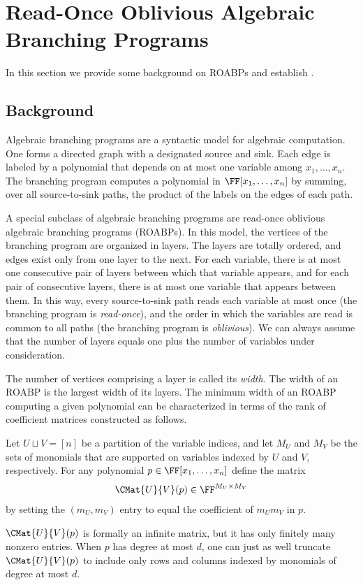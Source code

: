 \section{Read-Once Oblivious Algebraic Branching Programs}
\label{s.constant-width-roabp}

In this section we provide some background on ROABPs and establish
.

\subsection{Background}
\label{s.roabp.background}

Algebraic branching programs are a syntactic model for algebraic
computation.
One forms a directed graph with a designated source and sink.
Each edge is labeled by a polynomial that depends on at most one variable
among \(x_1,\ldots,x_n\).
The branching program computes a polynomial in \(\FF[x_1,\ldots,x_n]\) by
summing,
over all source-to-sink paths,
the product of the labels on the edges of each path.

A special subclass of algebraic branching programs are read-once oblivious
algebraic branching programs (ROABPs).
In this model, the vertices of the branching program are organized in layers.
The layers are totally ordered,
and edges exist only from one layer to the next.
For each variable,
there is at most one consecutive pair of layers between which that variable
appears,
and for each pair of consecutive layers,
there is at most one variable that appears between them.
In this way, every source-to-sink path reads each variable at most once
(the branching program is \emph{read-once}),
and the order in which the variables are read is common to all paths (the
branching program is \emph{oblivious}).
We can always assume that the number of layers equals one plus the number of
variables under consideration.

The number of vertices comprising a layer is called its \emph{width}.
The width of an ROABP is the largest width of its layers.
The minimum width of an ROABP computing a given polynomial can be
characterized in terms of the rank of coefficient matrices constructed as
follows.
\begin{definition}
  \label{def.var-split-poly-matrix}
  Let \(U\sqcup V = [n]\) be a partition of the variable indices,
  and let \({M}_U\) and \({M}_V\) be the sets of monomials
  that are supported on variables indexed by \(U\) and \(V\), respectively.
  For any polynomial \(p\in\FF[x_1,\ldots,x_n]\) define the matrix
  \[
    \CMat{U}{V}(p)
    \in
    \FF^{{M}_U \times {M}_V}
  \]
  by setting the \(({m}_U,{m}_V)\) entry to equal
  the coefficient of \({m}_U{m}_V\) in \(p\).
\end{definition}
\(\CMat{U}{V}(p)\) is formally an infinite matrix,
but it has only finitely many nonzero entries.
When \(p\) has degree at most \(d\),
one can just as well truncate \(\CMat{U}{V}(p)\) to include only rows and
columns indexed by monomials of degree at most \(d\).

